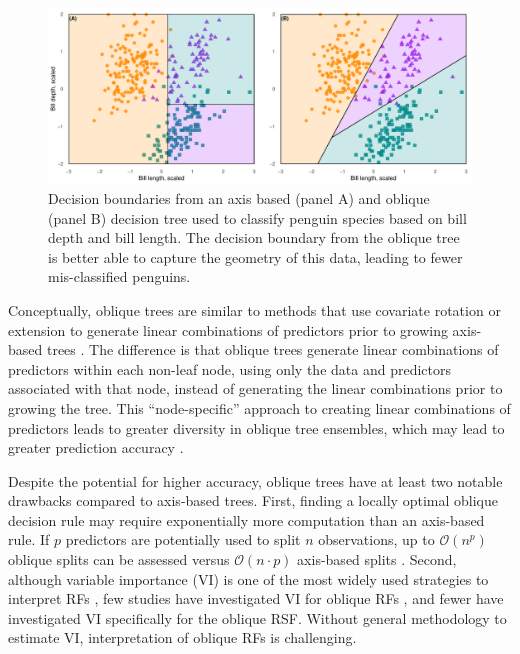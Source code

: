\documentclass[12pt]{article}\usepackage[]{graphicx}\usepackage[]{xcolor}
\makeatletter
\def\maxwidth{ %
  \ifdim\Gin@nat@width>\linewidth
    \linewidth
  \else
    \Gin@nat@width
  \fi
}
\newenvironment{knitrout}{}{} %
\makeatother
\begin{document}
\begin{knitrout}
\color{fgcolor}\begin{figure}
\includegraphics[width=\maxwidth]{figure/axis_v_oblique-1} \caption[Decision boundaries from an axis based (panel A) and oblique (panel B) decision tree used to classify penguin species based on bill depth and bill length]{Decision boundaries from an axis based (panel A) and oblique (panel B) decision tree used to classify penguin species based on bill depth and bill length. The decision boundary from the oblique tree is better able to capture the geometry of this data, leading to fewer mis-classified penguins.}\label{fig:axis_v_oblique}
\end{figure}

\end{knitrout}


Conceptually, oblique trees are similar to methods that use covariate rotation or extension to generate linear combinations of predictors prior to growing axis-based trees \citep{zhou2016random, wang2017random}. The difference is that oblique trees generate linear combinations of predictors within each non-leaf node, using only the data and predictors associated with that node, instead of generating the linear combinations prior to growing the tree. This ``node-specific'' approach to creating linear combinations of predictors leads to greater diversity in oblique tree ensembles, which may lead to greater prediction accuracy \citep{breiman2001random}.

Despite the potential for higher accuracy, oblique trees have at least two notable drawbacks compared to axis-based trees. First, finding a locally optimal oblique decision rule may require exponentially more computation than an axis-based rule. If $p$ predictors are potentially used to split $n$ observations, up to $\mathcal{O}(n^p)$ oblique splits can be assessed versus $\mathcal{O}(n \cdot p)$ axis-based splits \citep{heath1993induction, murthy1994system}. Second, although variable importance (VI) is one of the most widely used strategies to interpret RFs \citep{ishwaran2019standard}, few studies have investigated VI for oblique RFs \citep[see][Section~5]{menze2011oblique}, and fewer have investigated VI specifically for the oblique RSF. Without general methodology to estimate VI, interpretation of oblique RFs is challenging.
\end{document}
